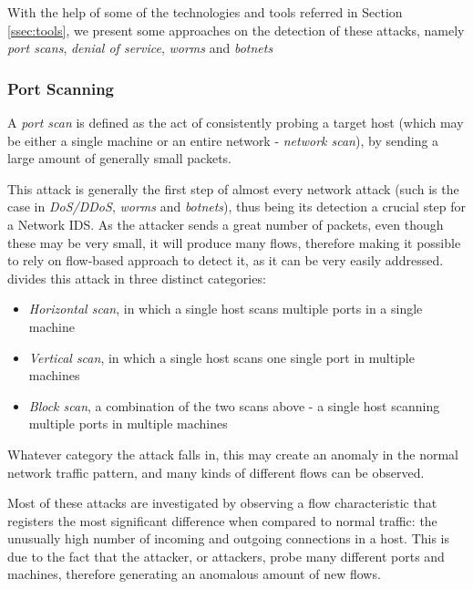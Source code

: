 \documentclass[runningheads,a4paper]{llncs}
\begin{document}
With the help of some of the technologies and tools referred in Section \ref{ssec:tools}, we present some approaches on the detection of these attacks, namely \textit{port scans}, \textit{denial of service}, \textit{worms} and \textit{botnets}  


\subsubsection{Port Scanning}

A \textit{port scan} is defined as the act of consistently probing a target host (which may be either a single machine or an entire network - \textit{network scan}), by sending a large amount of generally small packets. 

This attack is generally the first step of almost every network attack (such is the case in \textit{DoS/DDoS}, \textit{worms} and \textit{botnets}), thus being its detection a crucial step for a Network IDS. As the attacker sends a great number of packets, even though these may be very small, it will produce many flows, therefore making it possible to rely on flow-based approach to detect it, as it can be very easily addressed. \cite{Northcutt} divides this attack in three distinct categories:

\begin{itemize}
	\item \textit{Horizontal scan}, in which a single host scans multiple ports in a single machine
	\item \textit{Vertical scan}, in which a single host scans one single port in multiple machines
	\item \textit{Block scan}, a combination of the two scans above -  a single host scanning multiple ports in multiple machines
\end{itemize}

Whatever category the attack falls in, this may create an anomaly in the normal network traffic pattern, and many kinds of different flows can be observed. 

Most of these attacks are investigated by observing a flow characteristic that registers the most significant difference when compared to normal traffic: the unusually high number of incoming and outgoing connections in a host. This is due to the fact that the attacker, or attackers, probe many different ports and machines, therefore generating an anomalous amount of new flows.
\end{document}
